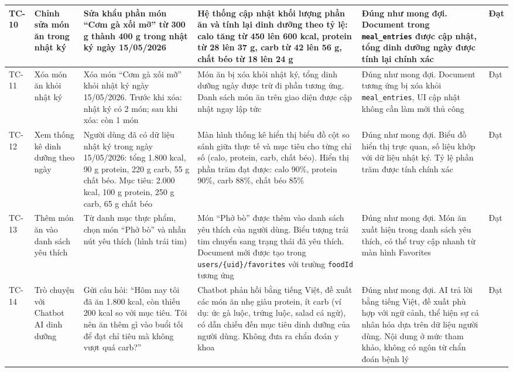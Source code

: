 \begin{longtable}{|p{1.2cm}|p{2.8cm}|p{3.2cm}|p{3.2cm}|p{2.8cm}|p{1.5cm}|}
    TC-10 & Chỉnh sửa món ăn trong nhật ký & Sửa khẩu phần món ``Cơm gà xối mỡ'' từ 300 g thành 400 g trong nhật ký ngày 15/05/2026 & Hệ thống cập nhật khối lượng phần ăn và tính lại dinh dưỡng theo tỷ lệ: calo tăng từ 450 lên 600 kcal, protein từ 28 lên 37 g, carb từ 42 lên 56 g, chất béo từ 18 lên 24 g & Đúng như mong đợi. Document trong \texttt{meal\_entries} được cập nhật, tổng dinh dưỡng ngày được tính lại chính xác & Đạt \\
    \hline
    TC-11 & Xóa món ăn khỏi nhật ký & Xóa món ``Cơm gà xối mỡ'' khỏi nhật ký ngày 15/05/2026. Trước khi xóa: nhật ký có 2 món; sau khi xóa: còn 1 món & Món ăn bị xóa khỏi nhật ký, tổng dinh dưỡng ngày được trừ đi phần tương ứng. Danh sách món ăn trên giao diện được cập nhật ngay lập tức & Đúng như mong đợi. Document tương ứng bị xóa khỏi \texttt{meal\_entries}, UI cập nhật không cần làm mới thủ công & Đạt \\
    \hline
    TC-12 & Xem thống kê dinh dưỡng theo ngày & Người dùng đã có dữ liệu nhật ký trong ngày 15/05/2026: tổng 1.800 kcal, 90 g protein, 220 g carb, 55 g chất béo. Mục tiêu: 2.000 kcal, 100 g protein, 250 g carb, 65 g chất béo & Màn hình thống kê hiển thị biểu đồ cột so sánh giữa thực tế và mục tiêu cho từng chỉ số (calo, protein, carb, chất béo). Hiển thị phần trăm đạt được: calo 90\%, protein 90\%, carb 88\%, chất béo 85\% & Đúng như mong đợi. Biểu đồ hiển thị trực quan, số liệu khớp với dữ liệu nhật ký. Tỷ lệ phần trăm được tính chính xác & Đạt \\
    \hline
    TC-13 & Thêm món ăn vào danh sách yêu thích & Từ danh mục thực phẩm, chọn món ``Phở bò'' và nhấn nút yêu thích (hình trái tim) & Món ``Phở bò'' được thêm vào danh sách yêu thích của người dùng. Biểu tượng trái tim chuyển sang trạng thái đã yêu thích. Document mới được tạo trong \texttt{users/\{uid\}/favorites} với trường \texttt{foodId} tương ứng & Đúng như mong đợi. Món ăn xuất hiện trong danh sách yêu thích, có thể truy cập nhanh từ màn hình Favorites & Đạt \\
    \hline
    TC-14 & Trò chuyện với Chatbot AI dinh dưỡng & Gửi câu hỏi: ``Hôm nay tôi đã ăn 1.800 kcal, còn thiếu 200 kcal so với mục tiêu. Tôi nên ăn thêm gì vào buổi tối để đạt chỉ tiêu mà không vượt quá carb?'' & Chatbot phản hồi bằng tiếng Việt, đề xuất các món ăn nhẹ giàu protein, ít carb (ví dụ: ức gà luộc, trứng luộc, salad cá ngừ), có dẫn chiếu đến mục tiêu dinh dưỡng của người dùng. Không đưa ra chẩn đoán y khoa & Đúng như mong đợi. AI trả lời bằng tiếng Việt, đề xuất phù hợp với ngữ cảnh, thể hiện sự cá nhân hóa dựa trên dữ liệu người dùng. Nội dung ở mức tham khảo, không có ngôn từ chẩn đoán bệnh lý & Đạt \\

\end{longtable}

